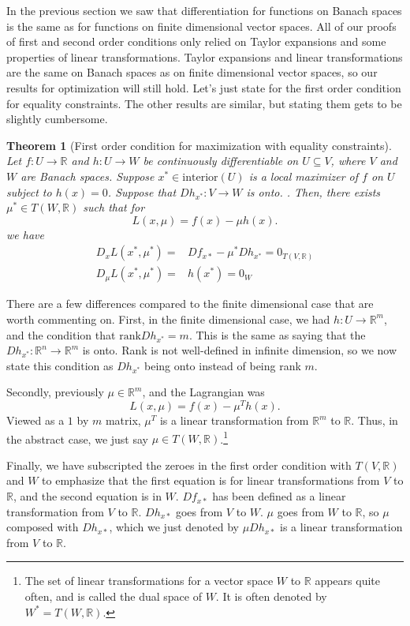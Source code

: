 \documentclass[12pt,reqno]{amsart}
\newtheorem{theorem}{Theorem}[section]
\theoremstyle{definition}
\def\R{\mathbb{R}}
\newcommand{\rank}{\mathrm{rank}}
\renewcommand{\to}{{\rightarrow}}
\begin{document}
In the previous section we saw that differentiation for functions on
Banach spaces is the same as for functions on finite dimensional
vector spaces. All of our proofs of first and second order conditions
only relied on Taylor expansions and some properties of linear
transformations. Taylor expansions and linear transformations are the
same on Banach spaces as on finite dimensional vector spaces, so our
results for optimization will still hold. Let's just state for the
first order condition for equality constraints. The other results are
similar, but stating them gets to be slightly cumbersome.
\begin{theorem}[First order condition for maximization with equality
  constraints] \label{thm:econv} Let $f:U \to \R$ and $h:U \to W$ be
  continuously differentiable on $U \subseteq V$, where 
  $V$ and $W$ are Banach spaces.  Suppose $x^* \in
  \mathrm{interior}(U)$ is a 
  local maximizer of $f$ on $U$ subject to
  $h(x) = 0$. Suppose that $Dh_{x^*}:V \to W$ is onto. 
. Then, there exists
  $\mu^* \in T(W,\R)$ such that for
  \[ L(x,\mu) = f(x) - \mu h(x). \]
  we have
  \begin{align*}
     D_xL(x^*,\mu^*) = & Df_{x*} - \mu^* Dh_{x^*} = 0_{T(V,\R)} \\
     D_\mu L(x^*,\mu^*) = & h(x^*) = 0_{W}
  \end{align*}
\end{theorem}
There are a few differences compared to the finite dimensional case
that are worth commenting on. First, in the finite dimensional case,
we had $h:U \to \R^m$, and the condition that $\rank Dh_{x^*} =
m$. This is the same as 
saying that the $Dh_{x^*}:\R^n \to \R^m$ is
onto. Rank is not well-defined in infinite dimension, so we now state
this condition as $Dh_{x^*}$ being onto instead of being rank
$m$. 

Secondly, previously $\mu \in \R^m$, and the Lagrangian was 
\[ L(x,\mu) = f(x) - \mu^T h(x). \]
Viewed as a $1$ by $m$ matrix, $\mu^T$ is a linear transformation from
$\R^m$ to $\R$. Thus, in the abstract case, we just say $\mu \in
T(W,\R)$.\footnote{The set of linear transformations for a vector
  space $W$ to $\R$ appears quite often, and is called the dual space
  of $W$. It is often denoted by $W^* = T(W,\R)$.}

Finally, we have subscripted the zeroes in the first order condition
with $T(V,\R)$ and $W$ to emphasize that the first equation is for
linear transformations from $V$ to $\R$, and the second equation is in
$W$. $Df_{x*}$ has been defined as a linear transformation from $V$ to
$\R$. $Dh_{x*}$ goes from $V$ to $W$. $\mu$ goes from $W$ to $\R$, so
$\mu$ composed with $Dh_{x*}$, which we just denoted by $\mu Dh_{x*}$
is a linear transformation from $V$ to $\R$.
\end{document}
